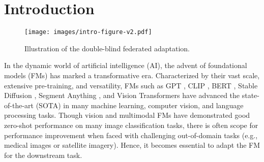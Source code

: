 \section{Introduction}
\label{sec: intro}

\begin{figure}
    \centering
    \texttt{[image: images/intro-figure-v2.pdf]}
    \caption{Illustration of the double-blind federated adaptation.}
    \label{fig: intro-figure}
    \vspace{-1em}
\end{figure}

In the dynamic world of artificial intelligence (AI), the advent of foundational models (FMs) has marked a transformative era. Characterized by their vast scale, extensive pre-training, and versatility, FMs such as GPT \cite{radford2019language, brown2020language}, CLIP \cite{radford2021learning}, BERT \cite{devlin2018bert, he2020deberta, liu2019roberta}, Stable Diffusion \cite{rombach2022high}, Segment Anything \cite{kirillov2023segment}, and Vision Transformers \cite{dosovitskiy2020image, liu2021swin} have advanced the state-of-the-art (SOTA) in many machine learning, computer vision, and language processing tasks. Though vision and multimodal FMs have demonstrated good zero-shot performance on many image classification tasks, there is often scope for performance improvement when faced with challenging out-of-domain tasks (e.g., medical images or satellite imagery). Hence, it becomes essential to adapt the FM for the downstream task.

